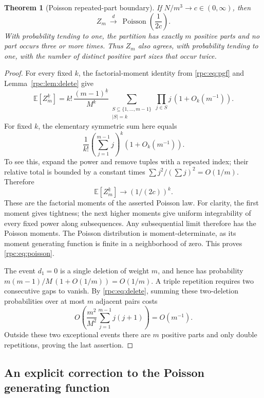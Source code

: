 \documentclass[11pt]{article}
\newtheorem{theorem}{Theorem}[section]
\theoremstyle{definition}
\theoremstyle{remark}
\newcommand{\fall}[2]{#1^{\underline{#2}}}
\newcommand{\E}{\mathbb E}
\DeclareMathOperator{\Pois}{Poisson}
\numberwithin{equation}{section}
\begin{document}
\begin{theorem}[Poisson repeated-part boundary]\label{rpc:thm:poisson}
If $N/m^3\to c\in(0,\infty)$, then
\begin{equation}\label{rpc:eq:poisson}
 Z_m\ \xrightarrow{\ d\ }\ \Pois\!\left(\frac1{2c}\right).
\end{equation}
With probability tending to one, the partition has exactly $m$ positive
parts and no part occurs three or more times. Thus $Z_m$ also agrees, with
probability tending to one, with the number of distinct positive part sizes
that occur twice.
\end{theorem}
\begin{proof}
For every fixed $k$, the factorial-moment identity from \eqref{rpc:eq:pgf} and
Lemma~\ref{rpc:lem:delete} give
\[
 \E[\fall{Z_m}k]
 =k!\,\frac{\fall{(m-1)}k}{M^k}
   \sum_{\substack{S\subseteq\{1,\ldots,m-1\}\\|S|=k}}
       \prod_{j\in S}j\,\left(1+O_k(m^{-1})\right).
\]
For fixed $k$, the elementary symmetric sum here equals
\[
 \frac1{k!}\left(\sum_{j=1}^{m-1}j\right)^k(1+O_k(m^{-1})).
\]
To see this, expand the power and remove tuples with a repeated index; their
relative total is bounded by a constant times
$\sum j^2/(\sum j)^2=O(1/m)$. Therefore
\[
 \E[\fall{Z_m}k]\longrightarrow(1/(2c))^k.
\]
These are the factorial moments of the asserted Poisson law. For clarity,
the first moment gives tightness; the next higher moments give uniform
integrability of every fixed power along subsequences. Any subsequential
limit therefore has the Poisson moments. The Poisson distribution is
moment-determinate, as its moment generating function is finite in a
neighborhood of zero. This proves \eqref{rpc:eq:poisson}.

The event $d_1=0$ is a single deletion of weight $m$, and hence has probability
$m(m-1)/M\,(1+O(1/m))=O(1/m)$. A triple repetition requires two consecutive
gaps to vanish. By \eqref{rpc:eq:delete}, summing these two-deletion probabilities
over at most $m$ adjacent pairs costs
\[
 O\left(\frac{m^2}{M^2}\sum_{j=1}^{m-1}j(j+1)\right)=O(m^{-1}).
\]
Outside these two exceptional events there are $m$ positive parts and only
double repetitions, proving the last assertion.
\end{proof}

\subsection{An explicit correction to the Poisson generating function}
\end{document}
